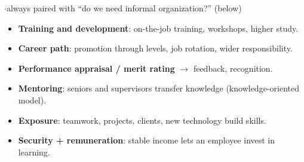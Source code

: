 {\color{sub}\footnotesize {}  \gap$\cdot$\gap always paired with ``do we need informal organization?'' (below)}
\begin{itemize}
  \item \textbf{Training and development}: on-the-job training, workshops, higher study.
  \item \textbf{Career path}: promotion through levels, job rotation, wider responsibility.
  \item \textbf{Performance appraisal / merit rating} $\rightarrow$ feedback, recognition.
  \item \textbf{Mentoring}: seniors and supervisors transfer knowledge (knowledge-oriented model).
  \item \textbf{Exposure}: teamwork, projects, clients, new technology build skills.
  \item \textbf{Security + remuneration}: stable income lets an employee invest in learning.
\end{itemize}

{\color{sub}\footnotesize {} }

